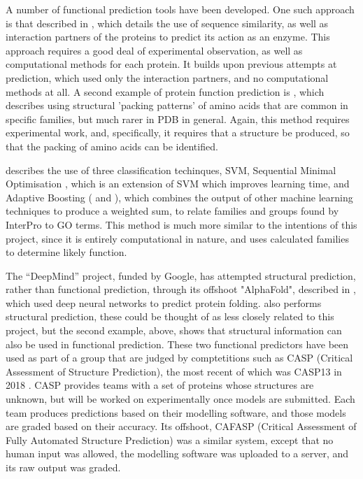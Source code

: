 \documentclass[12pt]{report}
\begin{document}
		A number of functional prediction tools have been developed.  One such approach is that described in \cite{RefWorks:doc:5d822c8ce4b07f40b9eae1b7}, which details the use of sequence similarity, as well as interaction partners of the proteins to predict its action as an enzyme.  This approach requires a good deal of experimental observation, as well as computational methods for each protein.  It builds upon previous attempts at prediction, which used only the interaction partners, and no computational methods at all.  A second example of protein function prediction is \cite{RefWorks:doc:5d822cfce4b0506e9759e8f8}, which describes using structural 'packing patterns' of amino acids that are common in specific families, but much rarer in PDB in general.  Again, this method requires experimental work, and, specifically, it requires that a structure be produced, so that the packing of amino acids can be identified. 
		
		\cite{RefWorks:doc:5d88a6d8e4b08db974488b16} describes the use of three classification techinques, SVM, Sequential Minimal Optimisation \citep{RefWorks:doc:5d88bafce4b0d12609fd641e}, which is an extension of SVM which improves learning time, and Adaptive Boosting (\cite{RefWorks:doc:5d88b8c6e4b0732b5fdb9dd5} and \cite{RefWorks:doc:5d88b89ce4b0d12609fd639c}), which combines the output of other machine learning techniques to produce a weighted sum, to relate families and groups found by InterPro \citep{RefWorks:doc:5d88a822e4b0d12609fd5fc4} to GO terms.  This method is much more similar to the intentions of this project, since it is entirely computational in nature, and uses calculated families to determine likely function.
		
		The ``DeepMind'' project, funded by Google, has attempted structural prediction, rather than functional prediction, through its offshoot "AlphaFold", described in \cite{RefWorks:doc:5d89ec21e4b02d8374a7bbe7}, which used deep neural networks to predict protein folding. \cite{RefWorks:doc:5d822dd5e4b07f40b9eae2f4} also performs structural prediction, these could be thought of as less closely related to this project, but the second example, above, shows that structural information can also be used in functional prediction.  These two functional predictors have been used as part of a group that are judged by comptetitions such as CASP (Critical Assessment of Structure Prediction), the most recent of which was CASP13 in 2018 \citep{RefWorks:doc:5d822fa4e4b0fa10423c5184}.  CASP provides teams with a set of proteins whose structures are unknown, but will be worked on experimentally once models are submitted.  Each team produces predictions based on their modelling software, and those models are graded based on their accuracy.  Its offshoot, CAFASP (Critical Assessment of Fully Automated Structure Prediction) was a similar system, except that no human input was allowed, the modelling software was uploaded to a server, and its raw output was graded.  
		
\end{document}
